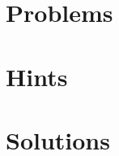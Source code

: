 \documentclass{article}
\begin{document}
\section{Problems}
\placestatements

\section{Hints}
\randomplacehints

\section{Solutions}
\placesolutions
\end{document}
